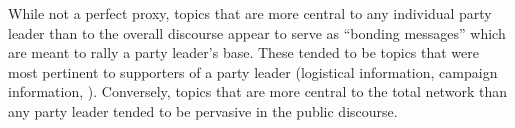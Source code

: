 While not a perfect proxy, topics that are more central to any individual party
leader than to the overall discourse appear to serve as ``bonding messages''
which are meant to rally a party leader's base. These tended to be topics that
were most pertinent to supporters of a party leader (logistical information,
campaign information, \etc). Conversely, topics that are more central to the
total network than any party leader tended to be pervasive in the public
discourse. 





\label{lastpage}



